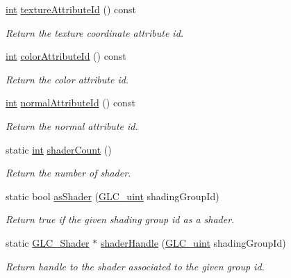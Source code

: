 \begin{DoxyCompactItemize}
\hyperlink{ioapi_8h_a787fa3cf048117ba7123753c1e74fcd6}{int} \hyperlink{class_g_l_c___shader_a340164f246e665b68813590a7032fb6d}{texture\-Attribute\-Id} () const 
\begin{DoxyCompactList}\small\item\em Return the texture coordinate attribute id. \end{DoxyCompactList}\item 
\hyperlink{ioapi_8h_a787fa3cf048117ba7123753c1e74fcd6}{int} \hyperlink{class_g_l_c___shader_aaa989ec17b4f181e37b3088066d7f563}{color\-Attribute\-Id} () const 
\begin{DoxyCompactList}\small\item\em Return the color attribute id. \end{DoxyCompactList}\item 
\hyperlink{ioapi_8h_a787fa3cf048117ba7123753c1e74fcd6}{int} \hyperlink{class_g_l_c___shader_aabde4e825c7662962f6e8f6d197c8f5b}{normal\-Attribute\-Id} () const 
\begin{DoxyCompactList}\small\item\em Return the normal attribute id. \end{DoxyCompactList}\item 
static \hyperlink{ioapi_8h_a787fa3cf048117ba7123753c1e74fcd6}{int} \hyperlink{class_g_l_c___shader_a380a7a9fc565a9548fb20a756ec3817b}{shader\-Count} ()
\begin{DoxyCompactList}\small\item\em Return the number of shader. \end{DoxyCompactList}\item 
static bool \hyperlink{class_g_l_c___shader_a5e60ee7c2d4b14c28eda0952ae95434f}{as\-Shader} (\hyperlink{glc__global_8h_abf950976fabed69026558df8e2da6c6b}{G\-L\-C\-\_\-uint} shading\-Group\-Id)
\begin{DoxyCompactList}\small\item\em Return true if the given shading group id as a shader. \end{DoxyCompactList}\item 
static \hyperlink{class_g_l_c___shader}{G\-L\-C\-\_\-\-Shader} $\ast$ \hyperlink{class_g_l_c___shader_a484fe74d205220544d7a9ca1c9e401cc}{shader\-Handle} (\hyperlink{glc__global_8h_abf950976fabed69026558df8e2da6c6b}{G\-L\-C\-\_\-uint} shading\-Group\-Id)
\begin{DoxyCompactList}\small\item\em Return handle to the shader associated to the given group id. \end{DoxyCompactList}\item 

\end{DoxyCompactItemize}
